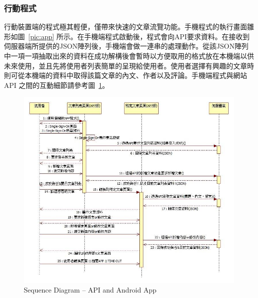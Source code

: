 \subsubsection{行動程式}
行動裝置端的程式極其輕便，僅帶來快速的文章流覽功能。手機程式的執行畫面雛形如圖~\ref{pic:app} 所示。在手機端程式啟動後，程式會向API要求資料。在接收到伺服器端所提供的JSON陣列後，手機端會做一連串的處理動作。從該JSON陣列中一項一項抽取出來的資料在成功解構後會暫時以方便取用的格式放在本機端以供未來使用，並且先將使用者列表簡單的呈現給使用者。使用者選擇有興趣的文章時則可從本機端的資料中取得該篇文章的內文、作者以及評論。手機端程式與網站 API 之間的互動細節請參考圖~\ref{pic:seq:appi}。

\begin{figure}[H]
\centering
\includegraphics[width=\textwidth]{img/useseq/appi.jpg}
\caption{Sequence Diagram -- API and Android App}
\label{pic:seq:appi}
\end{figure}


